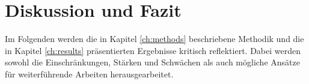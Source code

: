 \chapter{Diskussion und Fazit}
\label{ch:discussion}





Im Folgenden werden die in Kapitel \ref{ch:methods} beschriebene Methodik und die in Kapitel \ref{ch:results} präsentierten Ergebnisse kritisch reflektiert.
Dabei werden sowohl die Einschränkungen, Stärken und Schwächen als auch mögliche Ansätze für weiterführende Arbeiten herausgearbeitet.

